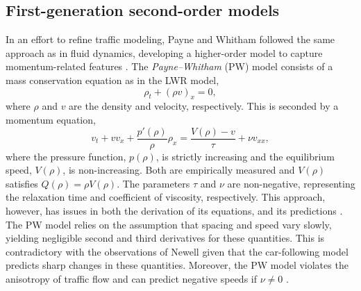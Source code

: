 \documentclass[preprint]{elsarticle}
\begin{document}
\subsection{First-generation second-order models}
In an effort to refine traffic modeling, Payne and Whitham followed the same approach as in fluid dynamics, developing a higher-order model to capture momentum-related features \cite{payne1971models,whitham1974linear}. The \textit{Payne--Whitham} (PW) model consists of a mass conservation equation as in the LWR model,  
\begin{equation}
\rho_t + (\rho v)_x = 0, 
\end{equation}
where $\rho$ and $v$ are the density and velocity, respectively. This is seconded by a momentum equation,
\begin{equation}
v_t+vv_x+\frac{p'\left(\rho\right)}{\rho}\rho_x =\frac{V(\rho)-v}{\tau}+\nu v_{xx} ,
\end{equation}
where the pressure function, $p(\rho)$, is strictly increasing and the equilibrium speed, $V(\rho)$, is non-increasing. Both are empirically measured and $V(\rho)$ satisfies $Q(\rho) = \rho V(\rho)$. The parameters $\tau$ and $\nu$ are non-negative, representing the relaxation time and coefficient of viscosity, respectively. This approach, however, has issues in both the derivation of its equations, and its predictions \cite{Dag_requiem}. The PW model relies on the assumption that spacing and speed vary slowly, yielding negligible second and third derivatives for these quantities. This is contradictory with the observations of Newell \cite{Newell} given that the car-following model predicts sharp changes in these quantities. Moreover, the PW model violates the anisotropy of traffic flow and can predict negative speeds if $\nu \neq 0$ \cite{Z}.

\end{document}
